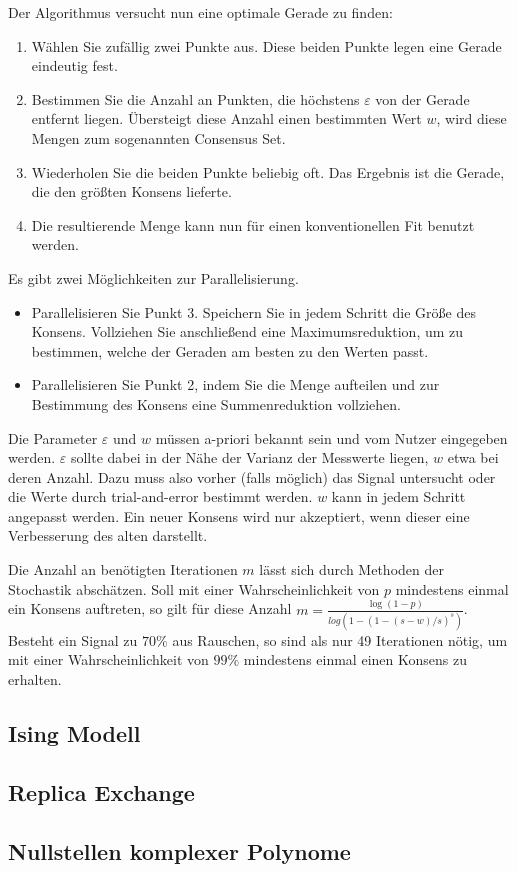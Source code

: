 \documentclass[headsepline=3pt,headinclude=true,12pt,oneside]{scrartcl}
\begin{document}
			Der Algorithmus versucht nun eine optimale Gerade zu finden:
			\begin{enumerate}
				\item Wählen Sie zufällig zwei Punkte aus. Diese beiden Punkte legen eine Gerade eindeutig fest.
				\item Bestimmen Sie die Anzahl an Punkten, die höchstens $\varepsilon$ von der Gerade entfernt liegen. Übersteigt diese Anzahl einen bestimmten Wert $w$, wird diese Mengen zum sogenannten Consensus Set.
				\item Wiederholen Sie die beiden Punkte beliebig oft. Das Ergebnis ist die Gerade, die den größten Konsens lieferte.
				
				\item Die resultierende Menge kann nun für einen konventionellen Fit benutzt werden.
			\end{enumerate}			 
			
			Es gibt zwei Möglichkeiten zur Parallelisierung.
			
			\begin{itemize}
				\item Parallelisieren Sie Punkt 3. Speichern Sie in jedem Schritt die Größe des Konsens. Vollziehen Sie anschließend eine Maximumsreduktion, um zu bestimmen, welche der Geraden am besten zu den Werten passt.
				\item Parallelisieren Sie Punkt 2, indem Sie die Menge aufteilen und zur Bestimmung des Konsens eine Summenreduktion vollziehen. 
			\end{itemize}			 
			
			Die Parameter $\varepsilon$ und $w$ müssen a-priori bekannt sein und vom Nutzer eingegeben werden. $\varepsilon$ sollte dabei in der Nähe der Varianz der Messwerte liegen, $w$ etwa bei deren Anzahl. Dazu muss also vorher (falls möglich) das Signal untersucht oder die Werte durch trial-and-error bestimmt werden. $w$ kann in jedem Schritt angepasst werden. Ein neuer Konsens wird nur akzeptiert, wenn dieser eine Verbesserung des alten darstellt. 
			
			Die Anzahl an benötigten Iterationen $m$ lässt sich durch Methoden der Stochastik abschätzen. Soll mit einer Wahrscheinlichkeit von $p$ mindestens einmal ein Konsens auftreten, so gilt für diese Anzahl $m = \frac{\log(1-p)}{log(1-(1-(s-w)/s)^s)}$. Besteht ein Signal zu $70\%$ aus Rauschen, so sind als nur 49 Iterationen nötig, um mit einer Wahrscheinlichkeit von $99\%$ mindestens einmal einen Konsens zu erhalten.

			\subsection{Ising Modell}
			\subsection{Replica Exchange}
			\subsection{Nullstellen komplexer Polynome}
		
\end{document}
